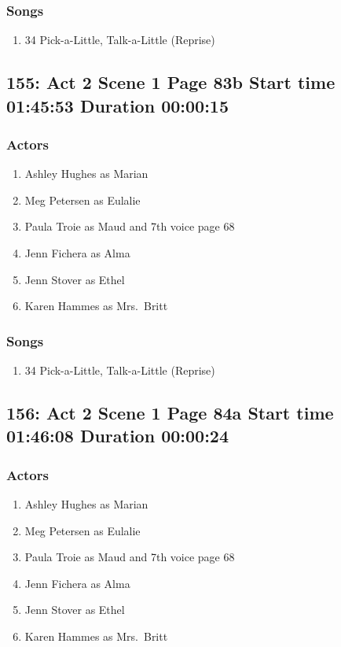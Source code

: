 \subsubsection{Songs}
\begin{enumerate}
\item 34 Pick-a-Little, Talk-a-Little (Reprise)
\end{enumerate}
\subsection{155: Act 2 Scene 1 Page 83b Start time 01:45:53 Duration 00:00:15}

\subsubsection{Actors}
\begin{enumerate}
\item Ashley Hughes as Marian
\item Meg Petersen as Eulalie
\item Paula Troie as Maud and 7th voice page 68
\item Jenn Fichera as Alma
\item Jenn Stover as Ethel
\item Karen Hammes as Mrs.~Britt
\end{enumerate}

\subsubsection{Songs}
\begin{enumerate}
\item 34 Pick-a-Little, Talk-a-Little (Reprise)
\end{enumerate}
\subsection{156: Act 2 Scene 1 Page 84a Start time 01:46:08 Duration 00:00:24}

\subsubsection{Actors}
\begin{enumerate}
\item Ashley Hughes as Marian
\item Meg Petersen as Eulalie
\item Paula Troie as Maud and 7th voice page 68
\item Jenn Fichera as Alma
\item Jenn Stover as Ethel
\item Karen Hammes as Mrs.~Britt
\end{enumerate}

